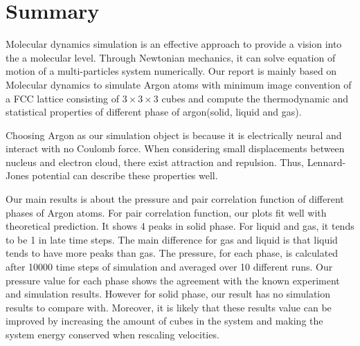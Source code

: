 \documentclass[a4paper,12pt]{article} %
\begin{document}
\newpage
\section{Summary}
\label{Summary}
Molecular dynamics simulation is an effective approach to provide a vision into the a molecular level. Through Newtonian mechanics, it can solve equation of motion of a multi-particles system numerically. Our report is mainly based on Molecular dynamics to simulate Argon atoms with minimum image convention
of a FCC lattice consisting of $3\times3\times3$ cubes and compute the thermodynamic and statistical properties of different phase of argon(solid, liquid and gas).\par
Choosing Argon as our simulation object is because it is electrically neural and interact with no Coulomb force. When considering small displacements between nucleus and electron cloud, there exist attraction and repulsion. Thus, Lennard-Jones potential can describe these properties well.\par
Our main results is about the pressure and pair correlation function of different phases of Argon atoms. For pair correlation function, our plots fit well with theoretical prediction. It shows 4 peaks in solid phase. For liquid and gas, it tends to be 1 in late time steps. The main difference for gas and liquid is that liquid tends to have more peaks than gas. The pressure, for each phase, is calculated after 10000 time steps of simulation and averaged over 10 different runs. Our pressure value for each phase shows the agreement with the known experiment and simulation results. However for solid phase, our result has no simulation results to compare with. Moreover, it is likely that these results value can be improved by increasing the amount of cubes in the system and making the system energy conserved when rescaling velocities.\par
\newpage



\end{document}
